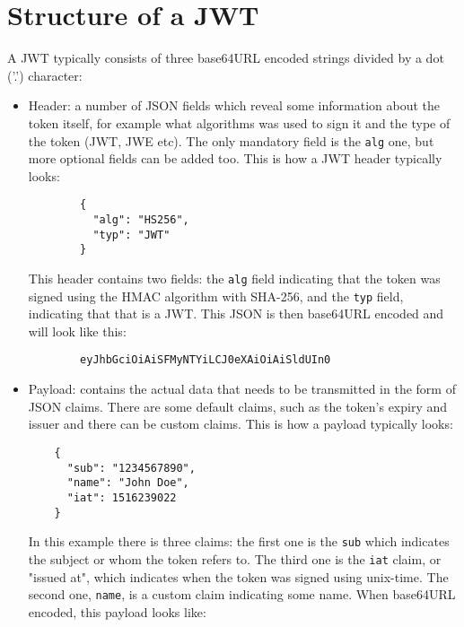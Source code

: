 \section{Structure of a JWT}
A JWT typically consists of three base64URL encoded strings divided by a dot ('.') character:
\begin{itemize}
    \item Header: a number of JSON fields which reveal some information about the token itself, for example what algorithms was used to sign it and the type of the token (JWT, JWE etc). The only mandatory field is the \lstinline{alg} one, but more  optional fields can be added too. This is how a JWT header typically looks:
    \begin{lstlisting}
        {
          "alg": "HS256",
          "typ": "JWT"
        }
    \end{lstlisting}
    This header contains two fields: the \lstinline{alg} field indicating that the token was signed using the HMAC algorithm with SHA-256, and the \lstinline{typ} field, indicating that that is a JWT.
    This JSON is then base64URL encoded and will look like this:
    \begin{lstlisting}
        eyJhbGciOiAiSFMyNTYiLCJ0eXAiOiAiSldUIn0
    \end{lstlisting}
    \cite{rfc7515-jws}
    \item Payload: contains the actual data that needs to be transmitted in the form of JSON \gls{claim}s. There are some default claims, such as the token's expiry and issuer and there can be custom claims. This is how a payload typically looks:
    \begin{lstlisting}
    {
      "sub": "1234567890",
      "name": "John Doe",
      "iat": 1516239022
    }
    \end{lstlisting}
    In this example there is three claims: the first one is the \lstinline{sub} which indicates the subject or whom the token refers to. The third one is the \lstinline{iat} claim, or "issued at", which indicates when the token was signed using \gls{unix-time}. The second one, \lstinline{name}, is a custom claim indicating some name. When base64URL encoded, this payload looks like:

\end{itemize}
